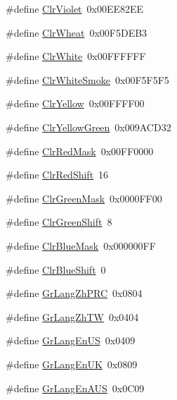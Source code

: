 \begin{DoxyCompactItemize}
\item 
\#define \hyperlink{group__primitives__api_ga9c1d987dadd94a4d66d15622ebb1525a}{Clr\+Violet}~0x00\+E\+E82\+E\+E
\item 
\#define \hyperlink{group__primitives__api_ga71e6ab49142949e32cc59639d257358f}{Clr\+Wheat}~0x00\+F5\+D\+E\+B3
\item 
\#define \hyperlink{group__primitives__api_ga3ea1ba6c922e4e52d2b7994715baed57}{Clr\+White}~0x00\+F\+F\+F\+F\+F\+F
\item 
\#define \hyperlink{group__primitives__api_ga939fde3f953e1fe47be34cafd6640b06}{Clr\+White\+Smoke}~0x00\+F5\+F5\+F5
\item 
\#define \hyperlink{group__primitives__api_gaea4d0baab30b6e27b877a0492744c9eb}{Clr\+Yellow}~0x00\+F\+F\+F\+F00
\item 
\#define \hyperlink{group__primitives__api_ga942a8ebeb8f564c51a766f35198189ea}{Clr\+Yellow\+Green}~0x009\+A\+C\+D32
\item 
\#define \hyperlink{group__primitives__api_gace856442fed5c85c0295a2352be5cd08}{Clr\+Red\+Mask}~0x00\+F\+F0000
\item 
\#define \hyperlink{group__primitives__api_gaeebcd53b09038e0907494561a5e2bd3a}{Clr\+Red\+Shift}~16
\item 
\#define \hyperlink{group__primitives__api_ga2ac237f9978590bc3f1f6d76afe1893b}{Clr\+Green\+Mask}~0x0000\+F\+F00
\item 
\#define \hyperlink{group__primitives__api_ga6fd564602c2d88c20e8e1d1a1a0299bf}{Clr\+Green\+Shift}~8
\item 
\#define \hyperlink{group__primitives__api_gabaac345e1df907e7135728930e8ee723}{Clr\+Blue\+Mask}~0x000000\+F\+F
\item 
\#define \hyperlink{group__primitives__api_gab1719411d0a5bc48897a76b324831a47}{Clr\+Blue\+Shift}~0
\item 
\#define \hyperlink{group__primitives__api_gaf81ca32b126129752da910d2efd7c1c9}{Gr\+Lang\+Zh\+P\+R\+C}~0x0804
\item 
\#define \hyperlink{group__primitives__api_gaa9fb7454b95cd706cf17cc1fd0620a67}{Gr\+Lang\+Zh\+T\+W}~0x0404
\item 
\#define \hyperlink{group__primitives__api_ga53d1db1de0716aa2d4c98054756ca315}{Gr\+Lang\+En\+U\+S}~0x0409
\item 
\#define \hyperlink{group__primitives__api_ga957249bfe4d9ae7466663246596d9722}{Gr\+Lang\+En\+U\+K}~0x0809
\item 
\#define \hyperlink{group__primitives__api_ga7e799ab7f46ee1bfdf6f70d61429e995}{Gr\+Lang\+En\+A\+U\+S}~0x0\+C09

\end{DoxyCompactItemize}
